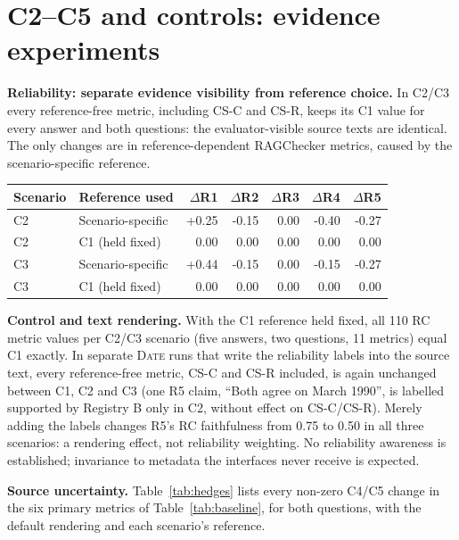 \documentclass[11pt,a4paper]{article}
\newenvironment{brieftable}{\par\noindent\begin{minipage}{\linewidth}}{\end{minipage}}
\begin{document}
\section{C2--C5 and controls: evidence experiments}
\textbf{Reliability: separate evidence visibility from reference choice.}
In C2/C3 every reference-free metric, including CS-C and CS-R, keeps its C1 value for every answer
and both questions: the evaluator-visible source texts are identical.
The only changes are in reference-dependent RAGChecker metrics, caused by the scenario-specific reference.

\begin{brieftable}
\label{tab:reliability}
{\small
\begin{tabular*}{\linewidth}{@{\extracolsep{\fill}}llrrrrr@{}}
\toprule
Scenario & Reference used & $\Delta$R1 & $\Delta$R2 & $\Delta$R3 & $\Delta$R4 & $\Delta$R5 \\
\midrule
C2 & Scenario-specific & +0.25 & -0.15 & 0.00 & -0.40 & -0.27 \\
C2 & C1 (held fixed) & 0.00 & 0.00 & 0.00 & 0.00 & 0.00 \\
C3 & Scenario-specific & +0.44 & -0.15 & 0.00 & -0.15 & -0.27 \\
C3 & C1 (held fixed) & 0.00 & 0.00 & 0.00 & 0.00 & 0.00 \\
\bottomrule
\end{tabular*}}
\end{brieftable}\par\vspace{3pt}

\textbf{Control and text rendering.} With the C1 reference held fixed, all 110 RC metric
values per C2/C3 scenario (five answers, two questions, 11 metrics) equal C1 exactly.
In separate \textsc{Date} runs that write the reliability labels into the source text, every
reference-free metric, CS-C and CS-R included, is again unchanged between C1, C2 and C3 (one R5 claim,
``Both agree on March 1990'', is labelled supported by Registry B only in C2, without effect on CS-C/CS-R).
Merely adding the labels changes R5's RC faithfulness from 0.75 to 0.50 in all three scenarios:
a rendering effect, not reliability weighting. No reliability awareness is established;
invariance to metadata the interfaces never receive is expected.

\textbf{Source uncertainty.} Table~\ref{tab:hedges} lists every non-zero C4/C5 change
in the six primary metrics of Table~\ref{tab:baseline}, for both questions,
with the default rendering and each scenario's reference.
\end{document}
